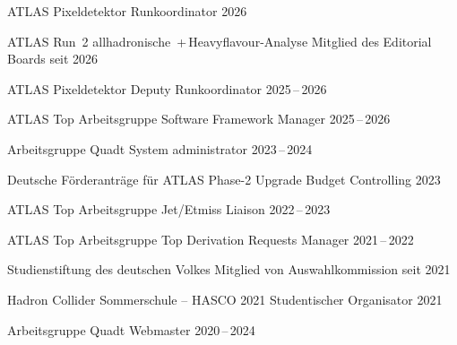 \begin{cvhonors}
  \cvhonor
    {ATLAS Pixeldetektor} %
    {Runkoordinator} %
    {} %
    {2026} %
    {}

  \cvhonor
    {ATLAS Run~2 allhadronische \ttbar\,+\,Heavyflavour-Analyse} %
    {Mitglied des Editorial Boards} %
    {} %
    {seit 2026} %
    {}

  \cvhonor
    {ATLAS Pixeldetektor} %
    {Deputy Runkoordinator} %
    {} %
    {2025\,--\,2026} %
    {}

  \cvhonor
    {ATLAS Top Arbeitsgruppe} %
    {Software Framework Manager} %
    {} %
    {2025\,--\,2026} %
    {}

  \cvhonor
    {Arbeitsgruppe Quadt} %
    {System administrator} %
    {} %
    {2023\,--\,2024} %
    {}

  \cvhonor
    {Deutsche F\"orderantr\"age f\"ur ATLAS Phase-2 Upgrade} %
    {Budget Controlling} %
    {} %
    {2023} %
    {}

  \cvhonor
    {ATLAS Top Arbeitsgruppe} %
    {Jet/Etmiss Liaison} %
    {} %
    {2022\,--\,2023} %
    {}

 \cvhonor
   {ATLAS Top Arbeitsgruppe} %
   {Top Derivation Requests Manager} %
   {} %
   {2021\,--\,2022} %
   {}

  \cvhonor
    {Studienstiftung des deutschen Volkes} %
    {Mitglied von Auswahlkommission} %
    {} %
    {seit 2021} %
    {}

  \cvhonor
    {Hadron Collider Sommerschule -- HASCO 2021} %
    {Studentischer Organisator} %
    {} %
    {2021} %
    {}

  \cvhonor
    {Arbeitsgruppe Quadt} %
    {Webmaster} %
    {} %
    {2020\,--\,2024} %
    {}


\end{cvhonors}



